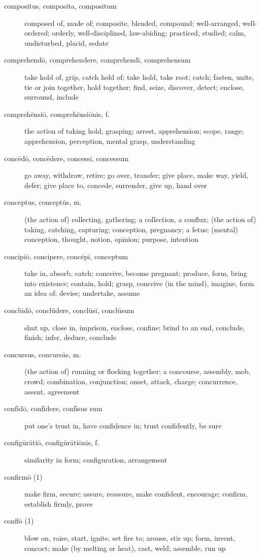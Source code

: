 \begin{description}
    \item[compositus, composita, compositum] composed of, made of; composite, blended, compound; well-arranged, well-ordered; orderly, well-disciplined, law-abiding; practiced, studied; calm, undisturbed, placid, sedate
    \item[comprehendō, comprehendere, comprehendī, comprehensum] take hold of, grip, catch hold of; take hold, take root; catch; fasten, unite, tie or join together, hold together; find, seize, discover, detect; enclose, surround, include
    \item[comprehēnsiō, comprehēnsiōnis, f.] the action of taking hold, grasping; arrest, apprehension; scope, range; apprehension, perception, mental grasp, understanding
    \item[concēdō, concēdere, concessī, concessum] \marginnote{*}go away, withdraw, retire; go over, transfer; give place, make way, yield, defer; give place to, concede, surrender, give up, hand over
    \item[conceptus, conceptūs, m.] (the action of) collecting, gathering; a collection, a conflux; (the action of) taking, catching, capturing; conception, pregnancy; a fetus; (mental) conception, thought, notion, opinion; purpose, intention
    \item[concipiō, concipere, concēpī, conceptum] take in, absorb, catch; conceive, become pregnant; produce, form, bring into existence; contain, hold; grasp, conceive (in the mind), imagine, form an idea of; devise; undertake, assume
    \item[conclūdō, conclūdere, conclūsī, conclūsum] shut up, close in, imprison, enclose, confine; brind to an end, conclude, finish; infer, deduce, conclude
    \item[concursus, concursūs, m.] (the action of) running or flocking together; a concourse, assembly, mob, crowd; combination, conjunction; onset, attack, charge; concurrence, assent, agreement
    \item[confīdō, confīdere, confīsus sum] put one's trust in, have confidence in; trust confidently, be sure
    \item[configūrātiō, configūrātiōnis, f.] similarity in form; configuration, arrangement
    \item[confirmō (1)] make firm, secure; assure, reassure, make confident, encourage; confirm, establish firmly, prove
    \item[conflō (1)] blow on, raise, start, ignite, set fire to; arouse, stir up; form, invent, concoct; make (by melting or heat), cast, weld; assemble, run up

\end{description}

